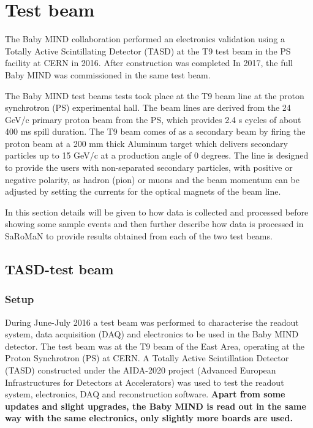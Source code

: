 \chapter{Test beam}
\label{c:Testbeam}

The Baby MIND collaboration performed an electronics validation using a Totally Active Scintillating Detector (TASD) at the T9 test beam in the PS facility at CERN in 2016. After construction was completed In 2017, the full Baby MIND was commissioned in the same test beam.

The Baby MIND test beams tests took place at the T9 beam line at the proton synchrotron (PS) experimental hall. The beam lines are derived from the 24 GeV/c primary proton beam from the PS, which provides 2.4 s cycles of about 400 ms spill duration. The T9 beam comes of as a secondary beam by firing the proton beam at a 200 mm thick Aluminum target which delivers secondary particles up to 15 GeV/c at a production angle of 0 degrees. The line is designed to provide the users with non-separated secondary particles, with positive or negative polarity, as hadron (pion) or muons and the beam momentum can be adjusted by setting the currents for the optical magnets of the beam line.

In this section details will be given to how data is collected and processed before showing some sample events and then further describe how data is processed in SaRoMaN to provide results obtained from each of the two test beams.


\section{TASD-test beam}

\subsection{Setup}
During June-July 2016 a test beam was performed to characterise the readout system, data acquisition (DAQ) and electronics to be used in the Baby MIND detector. The test beam was at the T9 beam of the East Area, operating at the Proton Synchrotron (PS) at CERN. A Totally Active Scintillation Detector (TASD) constructed under the AIDA-2020 project (Advanced European Infrastructures for Detectors at Accelerators) was used to test the readout system, electronics, DAQ and reconstruction software. \textbf{Apart from some updates and slight upgrades, the Baby MIND is read out in the same way with the same electronics, only slightly more boards are used.}

